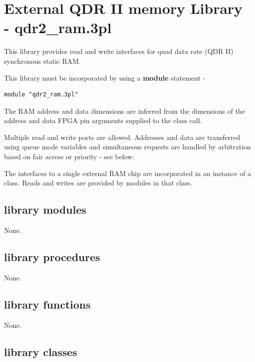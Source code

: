 \pagebreak

\section{External QDR II memory Library - qdr2\_ram.3pl}

    This library provides read and write interfaces for quad data rate (QDR II)
    synchronous static RAM.
    
    This library must be incorporated by using a {\bf module} statement -
    \begin{lstlisting}[gobble=4, language=threepl]
       module "qdr2_ram.3pl"
    \end{lstlisting}

    
    The RAM address and data dimensions are inferred from the dimensions
    of the address and data FPGA pin arguments supplied to the class
    call.

    Multiple read and write ports are allowed. Addresses and data are
    transferred using queue mode variables and simultaneous requests are handled
    by arbitration based on fair access or priority - see below.
    
    The interfaces to a single external RAM chip are incorporated in
    an instance of a class. Reads and writes are provided by modules in
    that class.


    \subsection{library modules}
    
        None.

    \subsection{library procedures}
    
        None.

    \subsection{library functions}
    
        None.

    
    
    \subsection{library classes}
    
